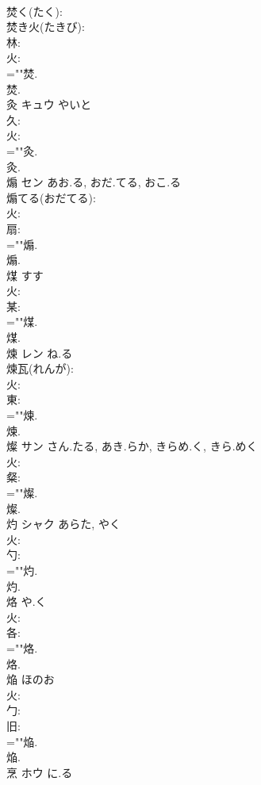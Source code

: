 \documentclass[8pt]{extreport}
\begin{document}
\begin{CJK}{UTF8}{min}
\\	焚く(たく): 
\\	焚き火(たきび): 
\\	林: 
\\	火: 
\\	=""焚.
\\	焚.
\\	灸	キュウ	やいと		
\\	久: 
\\	火: 
\\	=""灸.
\\	灸.
\\	煽	セン	あお.る, おだ.てる, おこ.る		
\\	煽てる(おだてる): 
\\	火: 
\\	扇: 
\\	=""煽.
\\	煽.
\\	煤		すす				
\\	火: 
\\	某: 
\\	=""煤.
\\	煤.
\\	煉	レン	ね.る		
\\	煉瓦(れんが): 
\\	火: 
\\	東: 
\\	=""煉.
\\	煉.
\\	燦	サン	さん.たる, あき.らか, きらめ.く, きら.めく		
\\	火: 
\\	粲: 
\\	=""燦.
\\	燦.
\\	灼	シャク	あらた, やく		
\\	火: 
\\	勺: 
\\	=""灼.
\\	灼.
\\	烙		や.く				
\\	火: 
\\	各: 
\\	=""烙.
\\	烙.
\\	焔		ほのお				
\\	火: 
\\	勹: 
\\	旧: 
\\	=""焔.
\\	焔.
\\	烹	ホウ	に.る		

\end{CJK}
\end{document}
